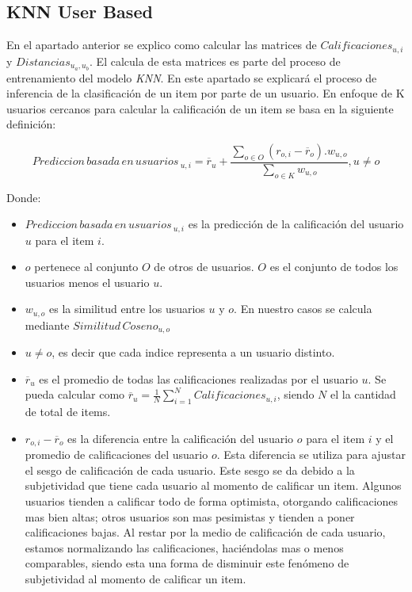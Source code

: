 \documentclass[11pt,a4paper,twoside]{thesis}
\begin{document}
\clearpage

\subsection{KNN User Based}

En el apartado anterior se explico como calcular las matrices de $Calificaciones_{u,i}$ y $Distancias_{u_a,u_b}$. El calcula de esta matrices es parte del proceso de entrenamiento del modelo \textit{KNN}. En este apartado se explicará el proceso de inferencia de la clasificación de un item por parte de un usuario. En enfoque de K usuarios cercanos para calcular la calificación de un item se basa en la siguiente definición:

\begin{equation}
	Prediccion \mspace{3mu}basada \mspace{3mu}en \mspace{3mu}usuarios\mspace{3mu}_{u, i} = \overline{r}_{u} + \frac{\sum_{o \in O} (r_{o, i} - \overline{r}_o) . w_{u, o} }{ \sum_{o \in K} w_{u, o}}, u \neq o
\end{equation}

\begin{description}
	\item[Donde:]
\end{description}
\begin{itemize}
	\item $Prediccion \mspace{3mu}basada \mspace{3mu}en \mspace{3mu}usuarios\mspace{3mu}_{u, i}$ es la predicción de la calificación del usuario $u$ para el item $i$.
	\item $o$ pertenece al conjunto $O$ de otros de usuarios. $O$ es el conjunto de todos los usuarios menos el usuario $u$.
	\item $w_{u,o}$ es la similitud entre los usuarios $u$ y $o$. En nuestro casos se calcula mediante $Similitud \mspace{3mu}Coseno_{u, o}$
	\item $u \neq o$, es decir que cada indice representa a un usuario distinto.
	\item $\overline{r}_{u}$ es el promedio de todas las calificaciones realizadas por el usuario $u$. Se pueda calcular como $\overline{r}_{u} = \frac{1}{N} \sum_{i=1}^N Calificaciones_{u,i}$, siendo $N$ el la cantidad de total de items.
 	\item $r_{o,i} - \overline{r}_{o}$ es la diferencia entre la calificación del usuario $o$ para el item $i$ y el promedio de calificaciones del usuario $o$. Esta diferencia se utiliza para ajustar el sesgo de calificación de cada usuario. Este sesgo se da debido a la subjetividad que tiene cada usuario al momento de calificar un item. Algunos usuarios tienden a calificar todo de forma optimista, otorgando calificaciones mas bien altas; otros usuarios son mas pesimistas y tienden a poner calificaciones bajas. Al restar por la medio de calificación de cada usuario, estamos normalizando las calificaciones, haciéndolas mas o menos comparables, siendo esta una forma de disminuir este fenómeno de subjetividad al momento de calificar un item.
\end{itemize}
\end{document}
